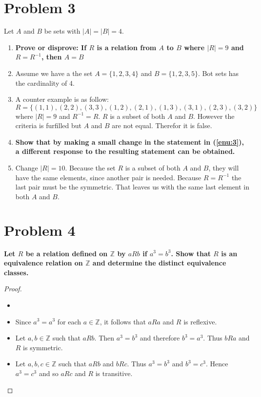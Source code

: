 \documentclass[english,11pt,a4paper]{article}
\begin{document}
\section*{Problem 3}
Let $A$ and $B$ be sets with $|A|=|B|=4$.
\begin{enumerate}[a]
\item \label{enu:3} \textbf{Prove or disprove: If $R$ is a relation from $A$ to $B$ where $|R|=9$ and $R=R^{-1}$, then $A=B$}
\item[] Assume we have a the set $A=\{1,2,3,4\}$ and $B=\{1,2,3,5\}$. Bot sets has the cardinality of 4. 
\item[] A counter example is as follow: $R=\{ (1,1), (2,2), (3,3), (1,2), (2,1), (1,3), (3,1), (2,3), (3,2) \}$ where $|R| = 9$ and $R^{-1} = R$. $R$ is a subset of both $A$ and $B$.
However the criteria is furfilled but $A$ and $B$ are not equal.
Therefor it is false.


\item \textbf{Show that by making a small change in the statement in (\ref{enu:3}), a different response to the resulting statement can be obtained.}
\item[] Change $|R|=10$. 
Because the set $R$ is a subset of both $A$ and $B$, they will have the same elements, since another pair is needed. 
Because $R=R^{-1}$ the last pair must be the symmetric.
That leaves us with the same last element in both $A$ and $B$.
\end{enumerate}



\section*{Problem 4}
\textbf{Let $R$ be a relation defined on $\mathbb{Z}$ by $aRb$ if $a^3=b^3$. Show that $R$ is an equivalence relation on $\mathbb{Z}$ and determine the distinct equivalence classes.}
\begin{proof}
\begin{itemize}
\item[]
\item Since $a^3=a^3$ for each $a \in \mathbb{Z}$, it follows that $ a R a$ and $R$ is reflexive. 
\item Let $a,b \in \mathbb{Z}$ such that $a R b$. 
Then $a^3=b^3$ and therefore $b^3 = a^3$. Thus $b R a$ and $R$ is symmetric.
\item Let $a,b,c \in \mathbb{Z}$ such that $aRb$ and $bRc$. Thus $a^3=b^3$ and $b^3=c^3$. 
Hence $a^3=c^3$ and so $aRc$ and $R$ is transitive.
\end{itemize}
\end{proof}
\end{document}
